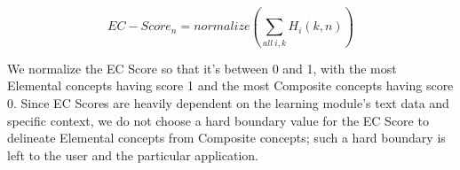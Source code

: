 \begin{equation}
EC-Score_{n} = normalize(\sum_{all\ i,k} H_{i}(k,n))
\end{equation}

We normalize the EC Score so that it's between 0 and 1, with the most Elemental concepts having score 1 and the most Composite concepts having score 0. Since EC Scores are heavily dependent on the learning module's text data and specific context, we do not choose a hard boundary value for the EC Score to delineate Elemental concepts from Composite concepts; such a hard boundary is left to the user and the particular application.
